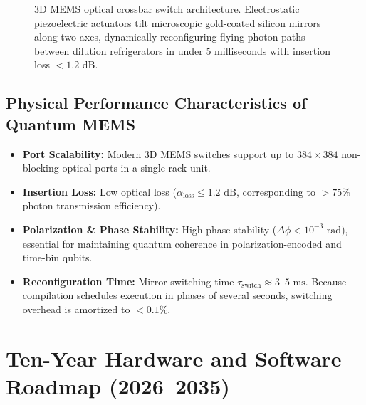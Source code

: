 \begin{figure}[htbp]
    \caption{3D MEMS optical crossbar switch architecture. Electrostatic piezoelectric actuators tilt microscopic gold-coated silicon mirrors along two axes, dynamically reconfiguring flying photon paths between dilution refrigerators in under 5 milliseconds with insertion loss $< 1.2$ dB.}
    \label{fig:mems_crossbar_switch_expanded}
\end{figure}

\subsection{Physical Performance Characteristics of Quantum MEMS}
\begin{itemize}
    \item \textbf{Port Scalability:} Modern 3D MEMS switches support up to $384 \times 384$ non-blocking optical ports in a single rack unit.
    \item \textbf{Insertion Loss:} Low optical loss ($\alpha_{\text{loss}} \le 1.2\text{ dB}$, corresponding to $> 75\%$ photon transmission efficiency).
    \item \textbf{Polarization \& Phase Stability:} High phase stability ($\Delta \phi < 10^{-3}\text{ rad}$), essential for maintaining quantum coherence in polarization-encoded and time-bin qubits.
    \item \textbf{Reconfiguration Time:} Mirror switching time $\tau_{\text{switch}} \approx 3\text{--}5\text{ ms}$. Because compilation schedules execution in phases of several seconds, switching overhead is amortized to $<0.1\%$.
\end{itemize}


\section{Ten-Year Hardware and Software Roadmap (2026--2035)}
\label{sec:ten_year_roadmap}

